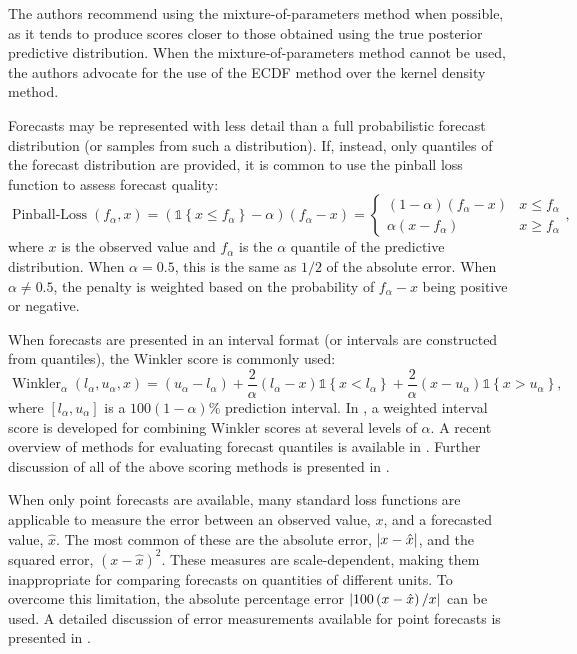 The authors recommend using the mixture-of-parameters method when possible, as it tends to produce scores closer to those obtained using the true posterior predictive distribution.
When the mixture-of-parameters method cannot be used, the authors advocate for the use of the ECDF method over the kernel density method.

Forecasts may be represented with less detail than a full probabilistic forecast distribution (or samples from such a distribution).
If, instead, only quantiles of the forecast distribution are provided, it is common to use the pinball loss function  to assess forecast quality:
\begin{equation}
    \operatorname{Pinball-Loss}(f_\alpha, x) = \left( \mathds{1} \left\{ x \leq f_\alpha \right\} - \alpha \right) \left( f_\alpha - x \right) =
    \begin{cases}
    \left( 1 - \alpha \right) \left( f_\alpha - x \right)   &   x \leq f_\alpha\\
    \alpha \left( x - f_\alpha \right)  &   x \geq f_\alpha
    \end{cases},
    \label{ch_2:eqn:pinball_loss}
\end{equation}
where \( x \) is the observed value and \( f_\alpha \) is the \( \alpha \) quantile of the predictive distribution.
When \( \alpha = 0.5 \), this is the same as \( 1 / 2  \) of the absolute error.
When \( \alpha \neq 0.5 \), the penalty is weighted based on the probability of \( f_\alpha - x \) being positive or negative.

When forecasts are presented in an interval format (or intervals are constructed from quantiles), the Winkler score is commonly used:
\begin{equation}
    \operatorname{Winkler}_\alpha \left( l_\alpha, u_\alpha, x \right) = \left( u_\alpha - l_\alpha \right) + \frac{2}{\alpha} \left( l_\alpha - x \right) \mathds{1} \left\{ x < l_\alpha \right\} + \frac{2}{\alpha} \left( x - u_\alpha \right) \mathds{1} \left\{ x > u_\alpha \right\},
\end{equation}
where \( \left[ l_\alpha, u_\alpha \right] \) is a \( 100 (1 - \alpha) \)\% prediction interval.
In \citet{Bracher2021Evaluating}, a weighted interval score is developed for combining Winkler scores at several levels of \( \alpha \).
A recent overview of methods for evaluating forecast quantiles is available in \citet{Gneiting2023Model}.
Further discussion of all of the above scoring methods is presented in \citet{gneiting2007strictly}.

When only point forecasts are available, many standard loss functions are applicable to measure the error between an observed value, \( x \), and a forecasted value, \( \hat{x} \).
The most common of these are the absolute error, \( \abs{x - \hat{x}} \), and the squared error, \( \left( x - \hat{x} \right)^2 \).
These measures are scale-dependent, making them inappropriate for comparing forecasts on quantities of different units.
To overcome this limitation, the absolute percentage error \( \abs{100 \left( x - \hat{x} \right)/ x} \) can be used.
A detailed discussion of error measurements available for point forecasts is presented in \citet{Hyndman2006Another}.
